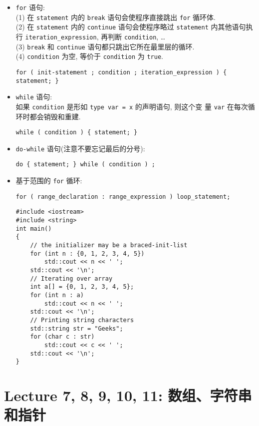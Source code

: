 \documentclass[a4paper,UTF8]{ctexart}
\begin{document}
\begin{itemize}[leftmargin=0pt, rightmargin=0cm, labelwidth=0.8cm, labelsep=0.2cm]
\item \lstinline{for} 语句:\\
  (1) 在 \lstinline{statement} 内的 \lstinline{break} 语句会使程序直接跳出
  \lstinline{for} 循环体.\\
  (2) 在 \lstinline{statement} 内的 \lstinline{continue} 语句会使程序略过
  \lstinline{statement} 内其他语句执行 \lstinline{iteration_expression}, 再判断
  \lstinline{condition}, \dots \\
  (3) \lstinline{break} 和 \lstinline{continue} 语句都只跳出它所在最里层的循环.\\
  (4) \lstinline{condition} 为空, 等价于 \lstinline{condition} 为 \lstinline{true}.
\begin{lstlisting}
for ( init-statement ; condition ; iteration_expression ) { statement; }
\end{lstlisting}
\item \lstinline{while} 语句:\\
如果 \lstinline{condition} 是形如 \lstinline{type var = x} 的声明语句, 则这个变
量 \lstinline{var} 在每次循环时都会销毁和重建.
\begin{lstlisting}
while ( condition ) { statement; }
\end{lstlisting}
\item \lstinline{do-while} 语句(注意不要忘记最后的分号):
\begin{lstlisting}
do { statement; } while ( condition ) ;
\end{lstlisting}
\item 基于范围的 \lstinline{for} 循环:
\begin{lstlisting}
for ( range_declaration : range_expression ) loop_statement;
\end{lstlisting}
\begin{lstlisting}
#include <iostream>
#include <string>
int main() 
{
    // the initializer may be a braced-init-list
    for (int n : {0, 1, 2, 3, 4, 5})
        std::cout << n << ' ';
    std::cout << '\n';
    // Iterating over array
    int a[] = {0, 1, 2, 3, 4, 5};     
    for (int n : a)
        std::cout << n << ' ';
    std::cout << '\n';
    // Printing string characters
    std::string str = "Geeks";
    for (char c : str) 
        std::cout << c << ' ';
    std::cout << '\n';
}
\end{lstlisting}
\end{itemize}

\section{Lecture 7, 8, 9, 10, 11: 数组、字符串和指针}
\end{document}
